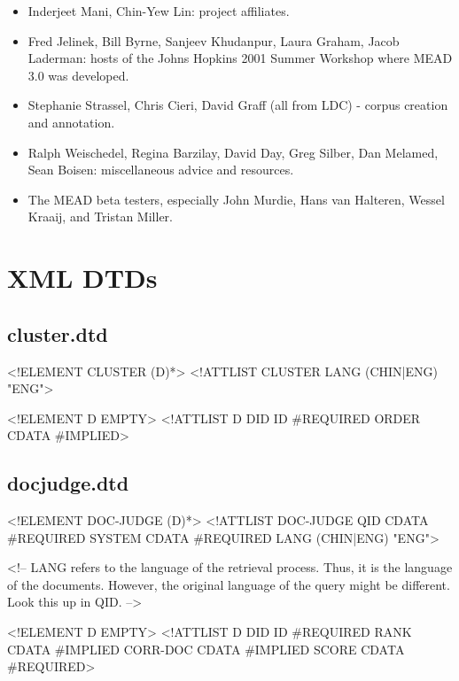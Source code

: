 \documentclass[10pt]{article}
\begin{document}
\begin{itemize}
\item Inderjeet Mani, Chin-Yew Lin: project affiliates.

\item Fred Jelinek, Bill Byrne, Sanjeev Khudanpur, Laura Graham, Jacob
   Laderman: hosts of the Johns Hopkins 2001 Summer Workshop where MEAD
   3.0 was developed.

\item Stephanie Strassel, Chris Cieri, David Graff (all from LDC) -
   corpus creation and annotation.

\item Ralph Weischedel, Regina Barzilay, David Day, Greg Silber, Dan
   Melamed, Sean Boisen: miscellaneous advice and resources.

\item The MEAD beta testers, especially John Murdie, Hans van Halteren,
  Wessel Kraaij, and Tristan Miller.

\end{itemize}





\appendix



\section{XML DTDs}

\subsection{cluster.dtd}
\begin{center}
\begin{boxedverbatim}
<!ELEMENT CLUSTER (D)*>
<!ATTLIST CLUSTER
   LANG (CHIN|ENG) "ENG">

<!ELEMENT D EMPTY>
<!ATTLIST D
   DID   ID    #REQUIRED
   ORDER CDATA #IMPLIED>
\end{boxedverbatim}
\end{center}



\subsection{docjudge.dtd}
\begin{center}
\begin{boxedverbatim}
<!ELEMENT DOC-JUDGE (D)*>
<!ATTLIST DOC-JUDGE
     QID    CDATA #REQUIRED
     SYSTEM CDATA #REQUIRED
     LANG   (CHIN|ENG) "ENG">

<!-- LANG refers to the language of the retrieval process.
     Thus, it is the language of the documents.
     However, the original language of the query might be
     different.
     Look this up in QID. -->

<!ELEMENT D EMPTY>
<!ATTLIST D
     DID   ID     #REQUIRED
     RANK  CDATA  #IMPLIED
     CORR-DOC CDATA #IMPLIED
     SCORE CDATA  #REQUIRED>
\end{boxedverbatim}
\end{center}
\end{document}
